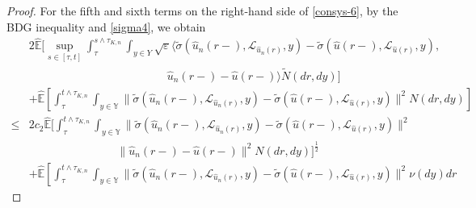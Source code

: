\documentclass[10pt,a4paper]{amsart}
\begin{document}
\begin{proof}
  For the fifth and sixth terms on the right-hand side of \eqref{consys-6},
  by the
  BDG inequality and \eqref{sigma4},
  we obtain
  \begin{align}\label{consys-10}
         & 2 \widehat{\mathbb{E}}
                 \bigg[ \sup_{s \in [\tau,t]}
                           \int_{\tau}^{s \wedge \tau_{K,n}} 
                               \int_{ {y \in Y} }
                                   \sqrt{\varepsilon}  
                                        \big\langle   
                                            \widetilde{\sigma}(\hat{u}_n(r-), \mathcal{L}_{\hat{u}_n(r)},y)
                                             - \widetilde{\sigma}(\hat{u}(r-), \mathcal{L}_{\hat{u}(r)},y),
                                                   \nonumber\\
          & \qquad\qquad\qquad\qquad\qquad\qquad\
                                              \hat{u}_n(r-) - \hat{u}(r-)
                                           \big\rangle \widetilde{N}(dr,dy)
                 \bigg]  \nonumber\\
          & + \widehat{\mathbb{E}}
                 \left[ \int_{\tau}^{t \wedge \tau_{K,n}} 
                              \int_{y \in \mathbb{Y} }
                                  \| \widetilde{\sigma}(\hat{u}_n(r-), \mathcal{L}_{\hat{u}_n(r)}, y)
                                     - \widetilde{\sigma}(\hat{u}(r-), \mathcal{L}_{\hat{u}(r)}, y)
                                  \|^2 N(dr,dy)
                 \right]  \nonumber\\
    \le & 2 c_2 \widehat{\mathbb{E}}
               \bigg[ \int_{\tau}^{t\wedge\tau_{K,n}}
                            \int_{y \in \mathbb{Y} }
                                \| \widetilde{\sigma}(\hat{u}_n(r-), \mathcal{L}_{\hat{u}_n(r)}, y)
                                    - \widetilde{\sigma}(\hat{u}(r-), \mathcal{L}_{\hat{u}(r)}, y)
                                \|^2 \nonumber\\
          & \qquad\qquad\qquad \ \ \ \ \ \ \ \
                     \| \hat{u}_n(r-) - \hat{u}(r-) \|^2 N(dr, dy)  
                \bigg]^{\frac{1}{2}}  \nonumber\\
          & + \widehat{\mathbb{E}}
                 \left[ \int_{\tau}^{t \wedge \tau_{K,n}} 
                              \int_{y \in \mathbb{Y} }
                                   \| \widetilde{\sigma}(\hat{u}_n(r-), \mathcal{L}_{\hat{u}_n(r)}, y)
                                       - \widetilde{\sigma}(\hat{u}(r-), \mathcal{L}_{\hat{u}(r)}, y)
                                   \|^2 \nu(dy) dr

\end{align}
\end{proof}
\end{document}
